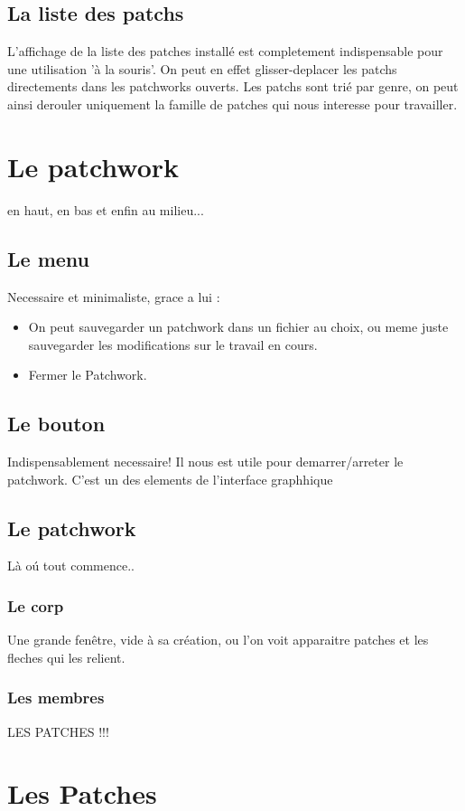 \subsection{La liste des patchs}
L'affichage de la liste des patches install\'e est completement indispensable 
pour une utilisation '\`a la souris'. On peut en effet glisser-deplacer 
les patchs directements dans les patchworks ouverts. Les patchs sont tri\'e par 
genre, on peut ainsi derouler uniquement la famille de patches qui nous interesse 
pour travailler.

\section{Le patchwork}
en haut, en bas et enfin au milieu...
\subsection{Le menu}
Necessaire et minimaliste, grace a lui :
\begin{itemize}
\item
On peut sauvegarder un patchwork dans un fichier au choix, ou meme juste sauvegarder
les modifications sur le travail en cours.
\item
Fermer le Patchwork.
\end{itemize}
\subsection{Le bouton}
Indispensablement necessaire! Il nous est utile pour demarrer/arreter le patchwork.
C'est un des elements de l'interface graphhique 
\subsection{Le patchwork}
L\`a o\'u tout commence..
\subsubsection{Le corp}
Une grande fen\^etre, vide \`a sa cr\'eation, ou l'on voit apparaitre patches et les 
fleches qui les relient.
\subsubsection{Les membres}
LES PATCHES !!!

\section{Les Patches}
